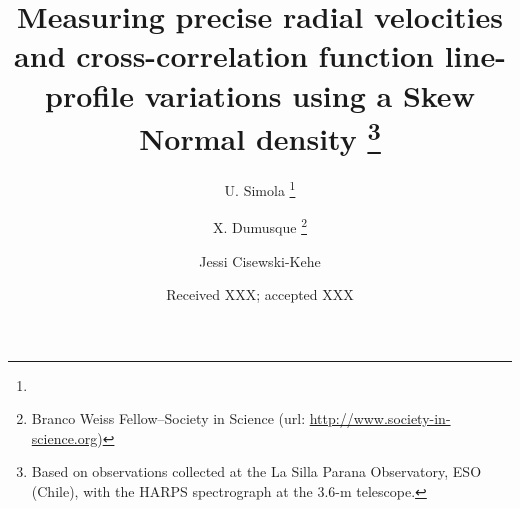 \documentclass{aa}
\begin{document}
\title{Measuring precise radial velocities and cross-correlation function line-profile variations using a Skew Normal density
\thanks{Based on observations collected at the La Silla Parana Observatory,
ESO (Chile), with the HARPS spectrograph at the 3.6-m telescope.}}


\author{U. Simola 
	    \thanks{}
	    \and X. Dumusque
	    \thanks{Branco Weiss Fellow--Society in Science (url: \url{http://www.society-in-science.org})}    
	    \and Jessi Cisewski-Kehe
	    }


\date{Received XXX; accepted XXX}
\end{document}
